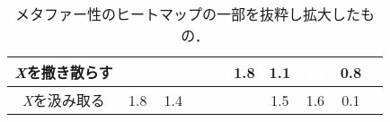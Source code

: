 \documentclass[12pt,usepdftitle=false]{beamer}
\begin{document}
\begin{frame}
\begin{table}
\begin{tabular}{|c|c|c|c|c|c|c|c|c|}
        \hline
        \emph{X}を撒き散らす & \cellcolor{sOrange}\textcolor{white}{2.5} & \cellcolor{sOrange}\textcolor{white}{2.4} & \cellcolor{sOrange}\textcolor{white}{2.0} & \cellcolor{sBlonde}1.8 & \cellcolor{sBlonde}1.1 & \cellcolor{sOrange}\textcolor{white}{2.1} & 0.8 \\
        \hline
        \emph{X}を汲み取る & \cellcolor{sBlonde}1.8 & \cellcolor{sBlonde}1.4 & \cellcolor{sOrange}\textcolor{white}{2.5} & \cellcolor{sOrange}\textcolor{white}{2.4} & \cellcolor{sBlonde}1.5 & \cellcolor{sBlonde}1.6 & 0.1 \\
        \hline
        \end{tabular}
        \caption{メタファー性のヒートマップの一部を抜粋し拡大したもの．}
    \end{table}

\end{frame}
\end{document}
